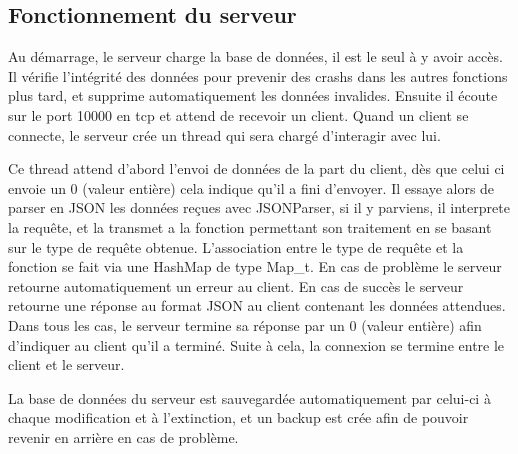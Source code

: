 % 
\subsection{Fonctionnement du serveur}
Au démarrage, le serveur charge la base de données, il est le seul à y avoir accès. Il vérifie l'intégrité des données pour prevenir des crashs dans les autres fonctions plus tard, et supprime automatiquement les données invalides. Ensuite il écoute sur le port 10000 en tcp et attend de recevoir un client. Quand un client se connecte, le serveur crée un thread qui sera chargé d'interagir avec lui.\par

Ce thread attend d'abord l'envoi de données de la part du client, dès que celui ci envoie un 0 (valeur entière) cela indique qu'il a fini d'envoyer.
Il essaye alors de parser en JSON les données reçues avec JSONParser, si il y parviens, il interprete la requête, et la transmet a la fonction permettant son traitement en se basant sur le type de requête obtenue. L'association entre le type de requête et la fonction se fait via une HashMap de type Map\_t. En cas de problème le serveur retourne automatiquement un erreur au client. En cas de succès le serveur retourne une réponse au format JSON au client contenant les données attendues. Dans tous les cas, le serveur termine sa réponse par un 0 (valeur entière) afin d'indiquer au client qu'il a terminé.
Suite à cela, la connexion se termine entre le client et le serveur.\par

La base de données du serveur est sauvegardée automatiquement par celui-ci à chaque modification et à l'extinction, et un backup est crée afin de pouvoir revenir en arrière en cas de problème.
% 
